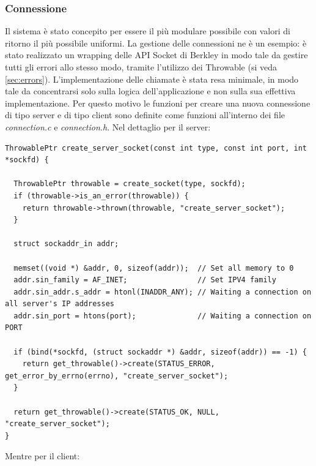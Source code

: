 \documentclass[italian]{tktltiki2}
\begin{document}
\subsubsection*{Connessione}
Il sistema è stato concepito per essere il più modulare possibile con valori di ritorno il più possibile uniformi. La gestione delle connessioni ne è un esempio: è stato realizzato un wrapping delle API Socket di Berkley in modo tale da gestire tutti gli errori allo stesso modo, tramite l'utilizzo dei Throwable (si veda \ref{sec:errors}). L'implementazione delle chiamate è stata resa minimale, in modo tale da concentrarsi solo sulla logica dell'applicazione e non sulla sua effettiva implementazione. Per questo motivo le funzioni per creare una nuova connessione di tipo server e di tipo client sono definite come funzioni all'interno dei file \emph{connection.c} e \emph{connection.h}. Nel dettaglio per il server:
\\
\begin{lstlisting}
ThrowablePtr create_server_socket(const int type, const int port, int *sockfd) {

  ThrowablePtr throwable = create_socket(type, sockfd);
  if (throwable->is_an_error(throwable)) {
    return throwable->thrown(throwable, "create_server_socket");
  }

  struct sockaddr_in addr;

  memset((void *) &addr, 0, sizeof(addr));  // Set all memory to 0
  addr.sin_family = AF_INET;                // Set IPV4 family
  addr.sin_addr.s_addr = htonl(INADDR_ANY); // Waiting a connection on all server's IP addresses
  addr.sin_port = htons(port);              // Waiting a connection on PORT

  if (bind(*sockfd, (struct sockaddr *) &addr, sizeof(addr)) == -1) {
    return get_throwable()->create(STATUS_ERROR, get_error_by_errno(errno), "create_server_socket");
  }

  return get_throwable()->create(STATUS_OK, NULL, "create_server_socket");
}
\end{lstlisting}
Mentre per il client:
\end{document}
